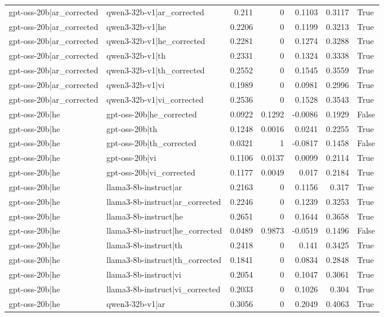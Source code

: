 \begin{table}
\begin{tabular}{l l r r r r l}
gpt-oss-20b|ar_corrected & qwen3-32b-v1|ar_corrected & 0.211 & 0 & 0.1103 & 0.3117 & True \\
gpt-oss-20b|ar_corrected & qwen3-32b-v1|he & 0.2206 & 0 & 0.1199 & 0.3213 & True \\
gpt-oss-20b|ar_corrected & qwen3-32b-v1|he_corrected & 0.2281 & 0 & 0.1274 & 0.3288 & True \\
gpt-oss-20b|ar_corrected & qwen3-32b-v1|th & 0.2331 & 0 & 0.1324 & 0.3338 & True \\
gpt-oss-20b|ar_corrected & qwen3-32b-v1|th_corrected & 0.2552 & 0 & 0.1545 & 0.3559 & True \\
gpt-oss-20b|ar_corrected & qwen3-32b-v1|vi & 0.1989 & 0 & 0.0981 & 0.2996 & True \\
gpt-oss-20b|ar_corrected & qwen3-32b-v1|vi_corrected & 0.2536 & 0 & 0.1528 & 0.3543 & True \\
gpt-oss-20b|he & gpt-oss-20b|he_corrected & 0.0922 & 0.1292 & -0.0086 & 0.1929 & False \\
gpt-oss-20b|he & gpt-oss-20b|th & 0.1248 & 0.0016 & 0.0241 & 0.2255 & True \\
gpt-oss-20b|he & gpt-oss-20b|th_corrected & 0.0321 & 1 & -0.0817 & 0.1458 & False \\
gpt-oss-20b|he & gpt-oss-20b|vi & 0.1106 & 0.0137 & 0.0099 & 0.2114 & True \\
gpt-oss-20b|he & gpt-oss-20b|vi_corrected & 0.1177 & 0.0049 & 0.017 & 0.2184 & True \\
gpt-oss-20b|he & llama3-8b-instruct|ar & 0.2163 & 0 & 0.1156 & 0.317 & True \\
gpt-oss-20b|he & llama3-8b-instruct|ar_corrected & 0.2246 & 0 & 0.1239 & 0.3253 & True \\
gpt-oss-20b|he & llama3-8b-instruct|he & 0.2651 & 0 & 0.1644 & 0.3658 & True \\
gpt-oss-20b|he & llama3-8b-instruct|he_corrected & 0.0489 & 0.9873 & -0.0519 & 0.1496 & False \\
gpt-oss-20b|he & llama3-8b-instruct|th & 0.2418 & 0 & 0.141 & 0.3425 & True \\
gpt-oss-20b|he & llama3-8b-instruct|th_corrected & 0.1841 & 0 & 0.0834 & 0.2848 & True \\
gpt-oss-20b|he & llama3-8b-instruct|vi & 0.2054 & 0 & 0.1047 & 0.3061 & True \\
gpt-oss-20b|he & llama3-8b-instruct|vi_corrected & 0.2033 & 0 & 0.1026 & 0.304 & True \\
gpt-oss-20b|he & qwen3-32b-v1|ar & 0.3056 & 0 & 0.2049 & 0.4063 & True \\

\end{tabular}
\end{table}
